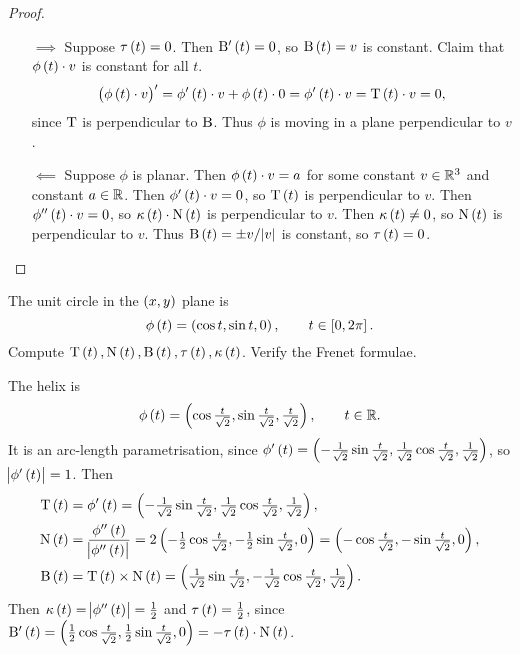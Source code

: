 \begin{proof}
\hfill
\begin{itemize}
\item[$ \implies $] Suppose $ \tau\br{t} = 0 $. Then $ \B'\br{t} = 0 $, so $ \B\br{t} = v $ is constant. Claim that $ \phi\br{t} \cdot v $ is constant for all $ t $.
$$ \br{\phi\br{t} \cdot v}' = \phi'\br{t} \cdot v + \phi\br{t} \cdot 0 = \phi'\br{t} \cdot v = \T\br{t} \cdot v = 0, $$
since $ \mathrm{T} $ is perpendicular to $ \mathrm{B} $. Thus $ \phi $ is moving in a plane perpendicular to $ v $.
\item[$ \impliedby $] Suppose $ \phi $ is planar. Then $ \phi\br{t} \cdot v = a $ for some constant $ v \in \mathbb{R}^3 $ and constant $ a \in \mathbb{R} $. Then $ \phi'\br{t} \cdot v = 0 $, so $ \T\br{t} $ is perpendicular to $ v $. Then $ \phi''\br{t} \cdot v = 0 $, so $ \kappa\br{t} \cdot \N\br{t} $ is perpendicular to $ v $. Then $ \kappa\br{t} \ne 0 $, so $ \N\br{t} $ is perpendicular to $ v $. Thus $ \B\br{t} = \pm v / \abs{v} $ is constant, so $ \tau\br{t} = 0 $.
\end{itemize}
\end{proof}

\begin{exercise*}
The unit circle in the $ \br{x, y} $ plane is
$$ \phi\br{t} = \br{\cos t, \sin t, 0}, \qquad t \in \sbr{0, 2\pi}. $$
Compute $ \T\br{t}, \N\br{t}, \B\br{t}, \tau\br{t}, \kappa\br{t} $. Verify the Frenet formulae.
\end{exercise*}

\pagebreak

\begin{example*}
The helix is
$$ \phi\br{t} = \br{\cos \tfrac{t}{\sqrt{2}}, \sin \tfrac{t}{\sqrt{2}}, \tfrac{t}{\sqrt{2}}}, \qquad t \in \RR. $$
It is an arc-length parametrisation, since $ \phi'\br{t} = \br{-\tfrac{1}{\sqrt{2}}\sin \tfrac{t}{\sqrt{2}}, \tfrac{1}{\sqrt{2}}\cos \tfrac{t}{\sqrt{2}}, \tfrac{1}{\sqrt{2}}} $, so $ \abs{\phi'\br{t}} = 1 $. Then
\begin{align*}
\T\br{t} & = \phi'\br{t} = \br{-\tfrac{1}{\sqrt{2}}\sin \tfrac{t}{\sqrt{2}}, \tfrac{1}{\sqrt{2}}\cos \tfrac{t}{\sqrt{2}}, \tfrac{1}{\sqrt{2}}}, \\
\N\br{t} & = \dfrac{\phi''\br{t}}{\abs{\phi''\br{t}}} = 2\br{-\tfrac{1}{2}\cos \tfrac{t}{\sqrt{2}}, -\tfrac{1}{2}\sin \tfrac{t}{\sqrt{2}}, 0} = \br{-\cos \tfrac{t}{\sqrt{2}}, -\sin \tfrac{t}{\sqrt{2}}, 0}, \\
\B\br{t} & = \T\br{t} \times \N\br{t} = \br{\tfrac{1}{\sqrt{2}}\sin \tfrac{t}{\sqrt{2}}, -\tfrac{1}{\sqrt{2}}\cos \tfrac{t}{\sqrt{2}}, \tfrac{1}{\sqrt{2}}}.
\end{align*}
Then $ \kappa\br{t} = \abs{\phi''\br{t}} = \tfrac{1}{2} $ and $ \tau\br{t} = \tfrac{1}{2} $, since $ \B'\br{t} = \br{\tfrac{1}{2}\cos \tfrac{t}{\sqrt{2}}, \tfrac{1}{2}\sin \tfrac{t}{\sqrt{2}}, 0} = -\tau\br{t} \cdot \N\br{t} $.
\end{example*}

